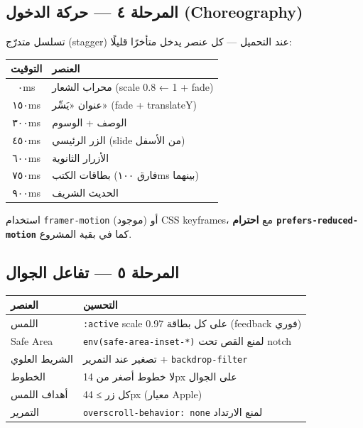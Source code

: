 \documentclass[11pt]{article}
\newcommand{\code}[1]{\textcolor{darkbg}{\texttt{\small #1}}}
\begin{document}
\subsection{المرحلة ٤ — حركة الدخول (Choreography)}
تسلسل متدرّج (stagger) عند التحميل — كل عنصر يدخل متأخرًا قليلًا:

\begin{center}
\renewcommand{\arraystretch}{1.25}
\begin{tabular}{@{}c p{8cm}@{}}
\toprule
\textbf{التوقيت} & \textbf{العنصر} \\
\midrule
٠ms & محراب الشعار (scale 0.8 ← 1 + fade) \\
١٥٠ms & عنوان «يَسِّر» (fade + translateY) \\
٣٠٠ms & الوصف + الوسوم \\
٤٥٠ms & الزر الرئيسي (slide من الأسفل) \\
٦٠٠ms & الأزرار الثانوية \\
٧٥٠ms & بطاقات الكتب (فارق ١٠٠ms بينهما) \\
٩٠٠ms & الحديث الشريف \\
\bottomrule
\end{tabular}
\end{center}

\begin{riskbox}
استخدام \code{framer-motion} (موجود) أو CSS keyframes، مع \textbf{احترام \code{prefers-reduced-motion}} كما في بقية المشروع.
\end{riskbox}

\subsection{المرحلة ٥ — تفاعل الجوال}
\begin{center}
\renewcommand{\arraystretch}{1.3}
\begin{tabular}{@{}p{4cm} p{10cm}@{}}
\toprule
\textbf{العنصر} & \textbf{التحسين} \\
\midrule
اللمس & \code{:active} scale 0.97 على كل بطاقة (feedback فوري) \\
Safe Area & \code{env(safe-area-inset-*)} لمنع القص تحت notch \\
الشريط العلوي & تصغير عند التمرير + \code{backdrop-filter} \\
الخطوط & لا خطوط أصغر من 14px على الجوال \\
أهداف اللمس & كل زر ≥ 44px (معيار Apple) \\
التمرير & \code{overscroll-behavior: none} لمنع الارتداد \\
\bottomrule
\end{tabular}
\end{center}
\end{document}

